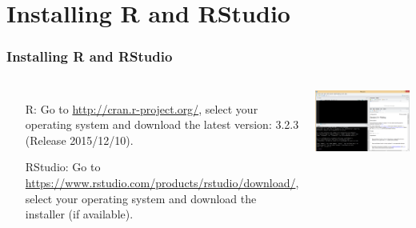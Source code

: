 \section{Installing R and RStudio}
\begin{frame}
  \frametitle{Installing R and RStudio}
    \begin{columns}
        \begin{enumerate}
           \item[R:] Go to \small \url{http://cran.r-project.org/}, select your operating system and download the latest version: 3.2.3 (Release 2015/12/10).
           \item[RStudio:] Go to \small \url{https://www.rstudio.com/products/rstudio/download/}, select your operating system and download the installer (if available).
        \end{enumerate}
%
       \begin{center}
         \includegraphics[width=1\textwidth]{images/Rwindow.png}
        \end{center}
      \end{columns}
\end{frame}


